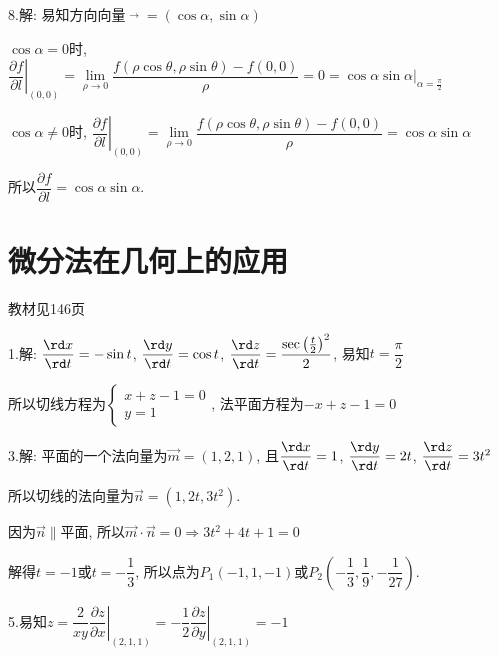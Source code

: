   8.解: 易知方向向量$ \mathop {{e_1}}\limits^ \to   = \left( {\cos \alpha ,\sin \alpha } \right)$

  $ \cos \alpha  = 0 $时, $\left. \dfrac{{\partial f}}{{\partial l}} \right|_{\left( {0,0} \right)}
  = \mathop {\lim }\limits_{\rho  \to 0} \dfrac{{f\left( {\rho \cos \theta ,\rho \sin \theta } \right) - f\left( {0,0} \right)}}{\rho }
  = 0 = \cos \alpha \sin \alpha \big|_{\alpha  = \frac{\pi }{2}}$

  $ \cos \alpha  \ne 0 $时, $\left. \dfrac{{\partial f}}{{\partial l}}\right|_{\left( {0,0} \right)} = \mathop {\lim }\limits_{\rho  \to 0} \dfrac{{f\left( {\rho \cos \theta ,\rho \sin \theta } \right) - f\left( {0,0} \right)}}{\rho } = \cos \alpha \sin \alpha $

  所以$ \dfrac{{\partial f}}{{\partial l}} = \cos \alpha \sin \alpha$.

\section{微分法在几何上的应用}
\begin{flushright}
  \color{zhanqing!80}
   教材见146页
\end{flushright}

  1.解: $\dfrac{{\rd x}}{{\rd t}} =  - \sin t$, $\dfrac{{\rd y}}{{\rd t}} = \cos t$, $\dfrac{{\rd z}}{{\rd t}} = \dfrac{ {{\sec \left( \frac{t}{2} \right)^2}  }}{2}$, 易知$t = \dfrac{\pi }{2}$

  所以切线方程为$\begin{cases}x+z-1=0\\y=1 \end{cases}$,
  法平面方程为$-x+z-1=0$

  3.解: 平面的一个法向量为$\overrightarrow m  = (1,2,1)$, 且$\dfrac{{\rd x}}{{\rd t}} = 1$, $\dfrac{{\rd y}}{{\rd t}} = 2t$, $\dfrac{{\rd z}}{{\rd t}} = 3t^2$

  所以切线的法向量为$\overrightarrow n  = (1,2t,3t^2)$.

  因为$ \overrightarrow n \parallel $平面,
  所以$\overrightarrow m  \cdot \overrightarrow n  = 0\Rightarrow3t^2+4t+1=0$

  解得$t=-1$或$t=-\dfrac{1}{3}$,
  所以点为$P_1(-1,1,-1)$或$P_2(-\dfrac{1}{3},\dfrac{1}{9},-\dfrac{1}{27})$.

  5.易知$z = \dfrac{2}{{xy}} 　　　　　　 \left. {\dfrac{{\partial z}}{{\partial x}}} 　\right|_{(2,1,1)}=-\dfrac{1}{2}  　　      　\left. {\dfrac{{\partial z}}{{\partial y}}} \right|_{(2,1,1)}=-1$

